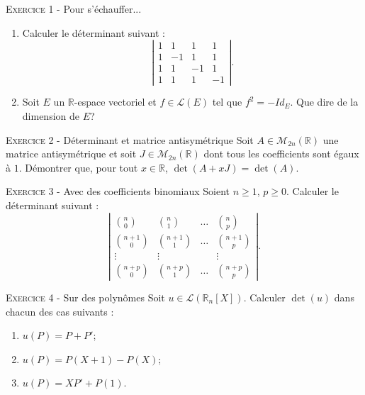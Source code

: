 \documentclass[11pt]{article}
\begin{document}
 

\begin{center}\textsc{{\huge }}\end{center}



\vskip0.3cm\noindent\textsc{Exercice 1} - Pour s'échauffer...
\vskip0.2cm
\begin{enumerate}
\item Calculer le déterminant suivant :
$$\left|\begin{array}{cccc}
1&1&1&1\\
1&-1&1&1\\
1&1&-1&1\\
1&1&1&-1
\end{array}\right|.$$
\item Soit $E$ un $\mathbb R$-espace vectoriel et $f\in\mathcal L(E)$ tel que $f^2=-Id_E$. Que dire de la dimension de $E$?
\end{enumerate}




\vskip0.3cm\noindent\textsc{Exercice 2} - Déterminant et matrice antisymétrique
\vskip0.2cm
Soit $A\in\mathcal M_{2n}(\mathbb R)$ une matrice antisymétrique et soit $J\in\mathcal M_{2n}(\mathbb R)$ dont tous les coefficients sont égaux à $1$. Démontrer que, pour tout $x\in\mathbb R$, $\det(A+xJ)=\det(A)$.




\vskip0.3cm\noindent\textsc{Exercice 3} - Avec des coefficients binomiaux
\vskip0.2cm
Soient $n\geq 1$, $p\geq 0$. Calculer le déterminant suivant :
$$\left|
\begin{array}{cccc}
\binom{n}0&\binom n1&\dots&\binom np\\
\binom{n+1}0&\binom{n+1}1&\dots&\binom{n+1}p\\
\vdots&\vdots&&\vdots\\
\binom{n+p}0&\binom{n+p}1&\dots&\binom{n+p}p
\end{array}
\right|.
$$




\vskip0.3cm\noindent\textsc{Exercice 4} - Sur des polynômes
\vskip0.2cm
Soit $u\in\mathcal L(\mathbb R_n[X])$. Calculer $\det(u)$ dans chacun des cas suivants :
\begin{enumerate}
\item $u(P)=P+P'$;
\item $u(P)=P(X+1)-P(X)$;
\item $u(P)=XP'+P(1)$.
\end{enumerate}
\end{document}
